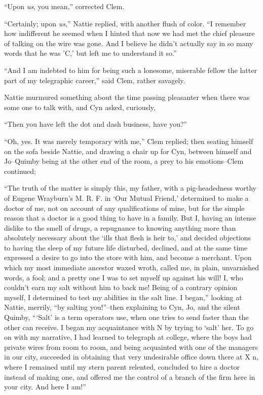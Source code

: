 ``Upon \emph{us}, you mean,'' corrected Clem.

``Certainly; upon \emph{us},'' Nattie replied, with another flush of color. ``I
remember how indifferent he seemed when I hinted that now we had met the
chief pleasure of talking on the wire was gone. And I believe he didn't
actually say in so many words that he was 'C,' but left me to understand
it so.''

``And I am indebted to him for being such a lonesome, miserable fellow
the latter part of my telegraphic career,'' said Clem, rather savagely.

Nattie murmured something about the time passing pleasanter when there
was some one to talk with, and Cyn asked, curiously,

``Then you have left the dot and dash business, have you?''

``Oh, yes. It was merely temporary with me,'' Clem replied; then seating
himself on the sofa beside Nattie, and drawing a chair up for Cyn,
between himself and Jo--Quimby being at the other end of the room, a
prey to his emotions--Clem continued;

``The truth of the matter is simply this, my father, with a
pig-headedness worthy of Eugene Wrayburn's M. R. F. in `Our Mutual
Friend,' determined to make a doctor of me, not on account of any
qualifications of mine, but for the simple reason that a doctor is a
good thing to have in a family. But I, having an intense dislike to the
smell of drugs, a repugnance to knowing anything more than absolutely
necessary about the `ills that flesh is heir to,' and decided objections
to having the sleep of my future life disturbed, declined, and at the
same time expressed a desire to go into the store with him, and become a
merchant. Upon which my most immediate ancestor waxed wroth, called me,
in plain, unvarnished words, a fool; and a pretty one I was to set
myself up against his will! I, who couldn't earn my salt without him to
back me! Being of a contrary opinion myself, I determined to test my
abilities in the salt line. I began,'' looking at Nattie, merrily, ``by
salting you!''--then explaining to Cyn, Jo, and the silent Quimby,
``{}`Salt' is a term operators use, when one tries to send faster than the
other can receive. I began my acquaintance with N by trying to `salt'
her. To go on with my narrative, I had learned to telegraph at college,
where the boys had private wires from room to room, and being acquainted
with one of the managers in our city, succeeded in obtaining that very
undesirable office down there at X n, where I remained until my stern
parent relented, concluded to hire a doctor instead of making one, and
offered me the control of a branch of the firm here in your city. And
here I am!''

